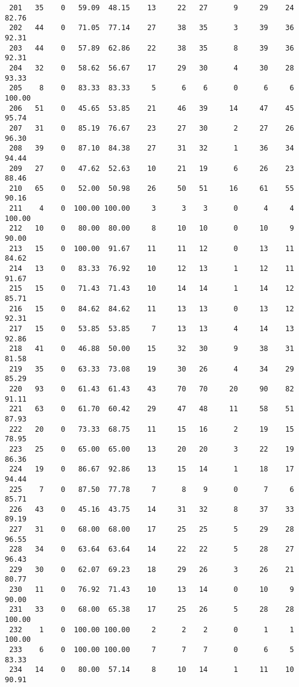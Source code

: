 \begin{verbatim}
 201   35    0   59.09  48.15    13     22   27      9     29    24    82.76
 202   44    0   71.05  77.14    27     38   35      3     39    36    92.31
 203   44    0   57.89  62.86    22     38   35      8     39    36    92.31
 204   32    0   58.62  56.67    17     29   30      4     30    28    93.33
 205    8    0   83.33  83.33     5      6    6      0      6     6   100.00
 206   51    0   45.65  53.85    21     46   39     14     47    45    95.74
 207   31    0   85.19  76.67    23     27   30      2     27    26    96.30
 208   39    0   87.10  84.38    27     31   32      1     36    34    94.44
 209   27    0   47.62  52.63    10     21   19      6     26    23    88.46
 210   65    0   52.00  50.98    26     50   51     16     61    55    90.16
 211    4    0  100.00 100.00     3      3    3      0      4     4   100.00
 212   10    0   80.00  80.00     8     10   10      0     10     9    90.00
 213   15    0  100.00  91.67    11     11   12      0     13    11    84.62
 214   13    0   83.33  76.92    10     12   13      1     12    11    91.67
 215   15    0   71.43  71.43    10     14   14      1     14    12    85.71
 216   15    0   84.62  84.62    11     13   13      0     13    12    92.31
 217   15    0   53.85  53.85     7     13   13      4     14    13    92.86
 218   41    0   46.88  50.00    15     32   30      9     38    31    81.58
 219   35    0   63.33  73.08    19     30   26      4     34    29    85.29
 220   93    0   61.43  61.43    43     70   70     20     90    82    91.11
 221   63    0   61.70  60.42    29     47   48     11     58    51    87.93
 222   20    0   73.33  68.75    11     15   16      2     19    15    78.95
 223   25    0   65.00  65.00    13     20   20      3     22    19    86.36
 224   19    0   86.67  92.86    13     15   14      1     18    17    94.44
 225    7    0   87.50  77.78     7      8    9      0      7     6    85.71
 226   43    0   45.16  43.75    14     31   32      8     37    33    89.19
 227   31    0   68.00  68.00    17     25   25      5     29    28    96.55
 228   34    0   63.64  63.64    14     22   22      5     28    27    96.43
 229   30    0   62.07  69.23    18     29   26      3     26    21    80.77
 230   11    0   76.92  71.43    10     13   14      0     10     9    90.00
 231   33    0   68.00  65.38    17     25   26      5     28    28   100.00
 232    1    0  100.00 100.00     2      2    2      0      1     1   100.00
 233    6    0  100.00 100.00     7      7    7      0      6     5    83.33
 234   14    0   80.00  57.14     8     10   14      1     11    10    90.91

\end{verbatim}
